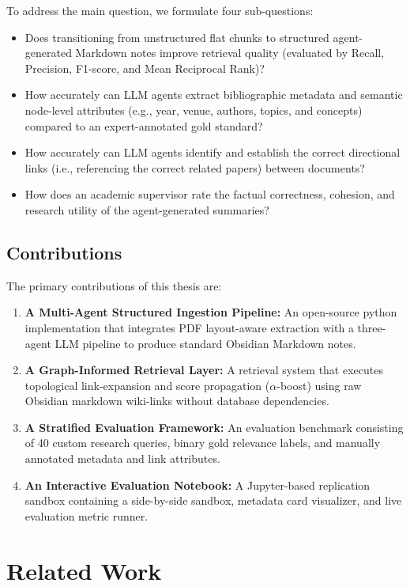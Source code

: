 \documentclass[11pt, a4paper, oneside]{article}
\begin{document}
To address the main question, we formulate four sub-questions:
\begin{itemize}
    \item[\textbf{RQ1}] Does transitioning from unstructured flat chunks to structured agent-generated Markdown notes improve retrieval quality (evaluated by Recall, Precision, F1-score, and Mean Reciprocal Rank)?
    \item[\textbf{RQ2}] How accurately can LLM agents extract bibliographic metadata and semantic node-level attributes (e.g., year, venue, authors, topics, and concepts) compared to an expert-annotated gold standard?
    \item[\textbf{RQ3}] How accurately can LLM agents identify and establish the correct directional links (i.e., referencing the correct related papers) between documents?
    \item[\textbf{RQ4}] How does an academic supervisor rate the factual correctness, cohesion, and research utility of the agent-generated summaries?
\end{itemize}

\subsection{Contributions}
The primary contributions of this thesis are:
\begin{enumerate}
    \item \textbf{A Multi-Agent Structured Ingestion Pipeline:} An open-source python implementation that integrates PDF layout-aware extraction with a three-agent LLM pipeline to produce standard Obsidian Markdown notes.
    \item \textbf{A Graph-Informed Retrieval Layer:} A retrieval system that executes topological link-expansion and score propagation ($\alpha$-boost) using raw Obsidian markdown wiki-links without database dependencies.
    \item \textbf{A Stratified Evaluation Framework:} An evaluation benchmark consisting of 40 custom research queries, binary gold relevance labels, and manually annotated metadata and link attributes.
    \item \textbf{An Interactive Evaluation Notebook:} A Jupyter-based replication sandbox containing a side-by-side sandbox, metadata card visualizer, and live evaluation metric runner.
\end{enumerate}

\section{Related Work}
\label{sec:related}
\end{document}
